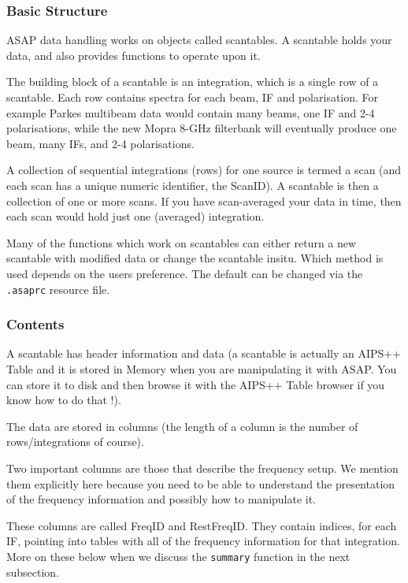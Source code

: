 \documentclass[11pt]{article}
\newcommand{\cmd}[1]{{\tt #1}}
\begin{document}
\subsubsection {Basic Structure}

ASAP data handling works on objects called
scantables.  A scantable holds your data, and also provides functions
to operate upon it.

The building block of a scantable is an integration, which is a single
row of a scantable. Each row contains spectra for each beam, IF and
polarisation. For example Parkes multibeam data would contain many
beams, one IF and 2-4 polarisations, while the new Mopra 8-GHz
filterbank will eventually produce one beam, many IFs, and 2-4
polarisations.

A collection of sequential integrations (rows) for one source is termed
a scan (and each scan has a unique numeric identifier, the ScanID). A
scantable is then a collection  of one or more scans. If you have
scan-averaged your data in time, then each scan would  hold just one
(averaged) integration.

Many of the functions which work on scantables can either return a
new scantable with modified data or change the scantable insitu. Which
method is used depends on the users preference. The default can be
changed via the {\tt .asaprc} resource file.

\subsubsection {Contents}

A scantable has header information and data
(a scantable is actually an AIPS++ Table and it is stored in Memory
when you are manipulating it with ASAP.  You can store it to disk and
then browse it with the AIPS++ Table browser if you know how to do
that !).

The data are stored in columns (the length of a column is the number of
rows/integrations of course).

Two important columns are those that describe the frequency setup.  We mention
them explicitly here because you need to be able to understand the presentation
of the frequency information and possibly how to manipulate it.

These columns are called FreqID and RestFreqID.  They contain indices, for
each IF, pointing into tables with all of the frequency information for that
integration.   More on these below when we discuss the \cmd{summary} function
in the next subsection.
\end{document}
